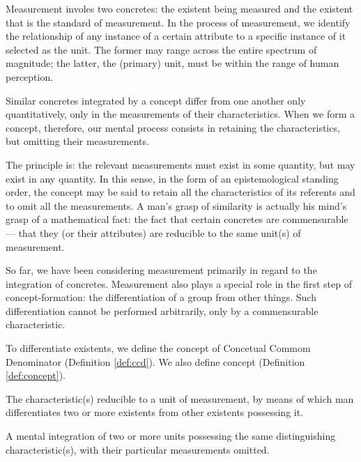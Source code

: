         Measurement involes two concretes: the existent being measured and the existent that is the standard of measurement. In the process of measurement, we identify the relationship of any instance of a certain attribute to a specific instance of it selected as the unit. The former may range across the entire spectrum of magnitude; the latter, the (primary) unit, must be within the range of human perception.

        Similar concretes integrated by a concept differ from one another only quantitatively, only in the measurements of their characteristics. When we form a concept, therefore, our mental process consists in retaining the characteristics, but omitting their measurements. 
        
        The principle is: the relevant measurements must exist in some quantity, but may exist in any quantity. In this sense, in the form of an epistemological standing order, the concept may be said to retain all the characteristics of its referents and to omit all the measurements. A man's grasp of similarity is actually his mind's grasp of a mathematical fact: the fact that certain concretes are commensurable — that they (or their attributes) are reducible to the same unit(s) of measurement.

        So far, we have been considering measurement primarily in regard to the integration of concretes. Measurement also plays a special role in the first step of concept-formation: the differentiation of a group from other things. Such differentiation cannot be performed arbitrarily, only by a commensurable characteristic. 
        
        To differentiate existents, we define the concept of Concetual Commom Denominator (Definition \ref{def:ccd}). We also define concept (Definition \ref{def:concept}).

            \begin{definition}
            \label{def:ccd}
                The characteristic(s) reducible to a unit of measurement, by means of which man differentiates two or more existents from other existents possessing it.
            \end{definition}

            \begin{definition}[Concept]
            \label{def:concept}
                A mental integration of two or more units possessing the same distinguishing characteristic(s), with their particular measurements omitted.
            \end{definition}

